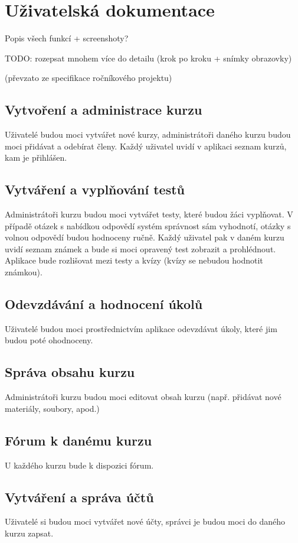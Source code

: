 \section{Uživatelská dokumentace}
Popis všech funkcí + screenshoty?

TODO: rozepsat mnohem více do detailu (krok po kroku + snímky obrazovky)

(převzato ze specifikace ročníkového projektu)

\subsection{Vytvoření a administrace kurzu}
Uživatelé budou moci vytvářet nové kurzy, administrátoři daného kurzu budou moci přidávat a odebírat členy. Každý uživatel uvidí v aplikaci seznam kurzů, kam je přihlášen.

\subsection{Vytváření a vyplňování testů}
Administrátoři kurzu budou moci vytvářet testy, které budou žáci vyplňovat. V případě otázek s nabídkou odpovědí systém správnost sám vyhodnotí, otázky s volnou odpovědí budou hodnoceny ručně. Každý uživatel pak v daném kurzu uvidí seznam známek a bude si moci opravený test zobrazit a prohlédnout. Aplikace bude rozlišovat mezi testy a kvízy (kvízy se nebudou hodnotit známkou).

\subsection{Odevzdávání a hodnocení úkolů}
Uživatelé budou moci prostřednictvím aplikace odevzdávat úkoly, které jim budou poté ohodnoceny.

\subsection{Správa obsahu kurzu}
Administrátoři kurzu budou moci editovat obsah kurzu (např. přidávat nové materiály, soubory, apod.) 

\subsection{Fórum k danému kurzu}
U každého kurzu bude k dispozici fórum. 

\subsection{Vytváření a správa účtů}
Uživatelé si budou moci vytvářet nové účty, správci je budou moci do daného kurzu zapsat.
